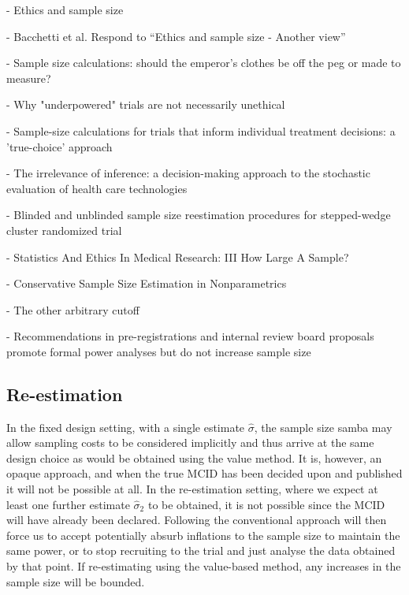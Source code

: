 \documentclass[sagev, Crown]{sagej}
\begin{document}
\cite{Bacchetti2005a} - Ethics and sample size

\cite{Bacchetti2005} - Bacchetti et al. Respond to ``Ethics and sample size - Another view''

\cite{Norman2012} - Sample size calculations: should the emperor's clothes be off the peg or made to measure?

\cite{Edwards1997} - Why "underpowered" trials are not necessarily unethical

\cite{Girling2007} - Sample-size calculations for trials that inform individual treatment decisions: a 'true-choice' approach

\cite{Claxton1999} - The irrelevance of inference: a decision-making approach to the stochastic evaluation of health care technologies

\cite{Grayling2018} - Blinded and unblinded sample size reestimation procedures for stepped-wedge cluster randomized trial

\cite{Altman1980} - Statistics And Ethics In Medical Research: III How Large A Sample?

\cite{DeMartini2010} - Conservative Sample Size Estimation in Nonparametrics

\cite{Bacchetti2019} - The other arbitrary cutoff

\cite{Bakker2020} - Recommendations in pre-registrations and internal review board proposals promote formal power analyses but do not increase sample size

\subsection{Re-estimation}

In the fixed design setting, with a single estimate $\hat{\sigma}$, the sample size samba may allow sampling costs to be considered implicitly and thus arrive at the same design choice as would be obtained using the value method. It is, however, an opaque approach, and when the true MCID has been decided upon and published it will not be possible at all. In the re-estimation setting, where we expect at least one further estimate $\hat{\sigma}_2$ to be obtained, it is not possible since the MCID will have already been declared. Following the conventional approach will then force us to accept potentially absurb inflations to the sample size to maintain the same power, or to stop recruiting to the trial and just analyse the data obtained by that point. If re-estimating using the value-based method, any increases in the sample size will be bounded.
\end{document}
